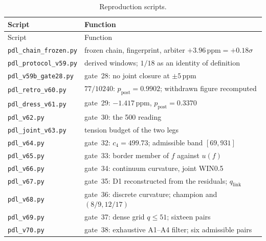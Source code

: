 \documentclass[11pt,a4paper]{article}
\newcommand{\ppm}{\ensuremath{\,\mathrm{ppm}}}
\begin{document}
{\small
\begin{longtable}{@{}p{}p{}@{}}
\caption{Reproduction scripts.}\label{tab:scripts}\\
\toprule
Script & Function \\
\midrule
\endfirsthead
\toprule
Script & Function \\
\midrule
\endhead
\texttt{pdl\_chain\_frozen.py} & frozen chain, fingerprint, arbiter $+3.96\ppm = +0.18\sigma$ \\
\texttt{pdl\_protocol\_v59.py} & derived windows; $1/18$ as an identity of definition \\
\texttt{pdl\_v59b\_gate28.py} & gate~28: no joint closure at $\pm5\ppm$ \\
\texttt{pdl\_retro\_v60.py} & $77/10240$: $p_{\mathrm{post}} = 0.9902$; withdrawn figure recomputed \\
\texttt{pdl\_dress\_v61.py} & gate~29: $-1.417\ppm$, $p_{\mathrm{post}} = 0.3370$ \\
\texttt{pdl\_v62.py} & gate~30: the 500 reading \\
\texttt{pdl\_joint\_v63.py} & tension budget of the two legs \\
\texttt{pdl\_v64.py} & gate~32: $c_4 = 499.73$; admissible band $[69, 931]$ \\
\texttt{pdl\_v65.py} & gate~33: border member of $f$ against $u(f)$ \\
\texttt{pdl\_v66.py} & gate~34: continuum curvature, joint WIN0.5 \\
\texttt{pdl\_v67.py} & gate~35: D1 reconstructed from the residuals; $q_{\mathrm{link}}$ \\
\texttt{pdl\_v68.py} & gate~36: discrete curvature; champion and $(8/9, 12/17)$ \\
\texttt{pdl\_v69.py} & gate~37: dense grid $q\le51$; sixteen pairs \\
\texttt{pdl\_v70.py} & gate~38: exhaustive A1--A4 filter; six admissible pairs \\
\bottomrule
\end{longtable}}



\nocite{d72ev1}
\end{document}
